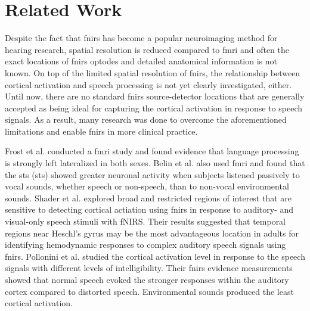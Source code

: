 \section{Related Work}


Despite the fact that \acrshort{fnirs} has become a popular neuroimaging method for hearing research, spatial resolution is reduced compared to \acrshort{fmri} and often the exact locations of \acrshort{fnirs} optodes and detailed anatomical information is not known. On top of the limited spatial resolution of \acrshort{fnirs}, the relationship between cortical activation and speech processing is not yet clearly investigated, either. Until now,  there are no standard \acrshort{fnirs} source-detector locations that are generally accepted as being ideal for capturing the cortical activation in response to speech signals. As a result, many research was done to overcome the aforementioned limitations and enable \acrshort{fnirs} in more clinical practice.

Frost et al. \citeyearpar {Frost1999-vs} conducted a \acrshort{fmri} study and found evidence that language processing is strongly left lateralized in both sexes. Belin et al. \citeyearpar {Belin2000} also used \acrshort{fmri} and found that the \acrlong{sts} (\acrshort{sts}) showed greater neuronal activity when subjects listened passively to vocal sounds, whether speech or non-speech, than to non-vocal environmental sounds. Shader et al. \citeyearpar {Shader2021} explored broad and restricted regions of interest that are sensitive to detecting cortical actiation using  \acrshort{fnirs} in response to auditory- and visual-only speech stimuli with fNIRS. Their results suggested that temporal regions near Heschl's gyrus may be the most advantageous location in adults for identifying hemodynamic responses to complex auditory speech signals using \acrshort{fnirs}. Pollonini et al. \citeyearpar{Pollonini2013} studied the cortical activation level in response to the speech signals with different levels of intelligibility. Their \acrshort{fnirs} evidence measurements showed that normal speech evoked the stronger responses within the auditory cortex compared to distorted speech. Environmental sounds produced the least cortical activation.



